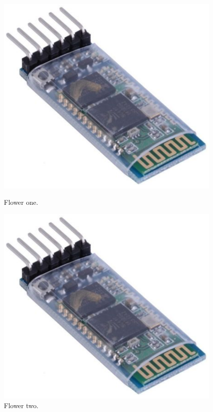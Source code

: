 \begin{figure}[h]
	\centering
	\begin{minipage}[b]{0.4\textwidth}
		\includegraphics[width=\textwidth]{img/hardware/bluetooth_zs-040.png}
		\caption{Flower one.}
	\end{minipage}
	\hfill
	\begin{minipage}[b]{0.4\textwidth}
		\includegraphics[width=\textwidth]{img/hardware/bluetooth_zs-040.png}
		\caption{Flower two.}
	\end{minipage}
\end{figure}


